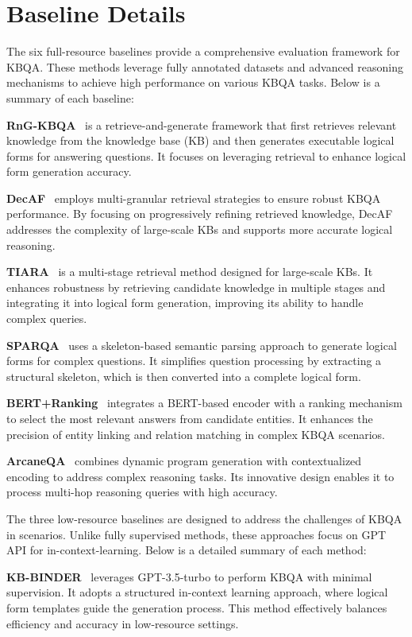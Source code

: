 \documentclass{article}
\theoremstyle{plain}
\theoremstyle{definition}
\theoremstyle{remark}
\begin{document}
\section{Baseline Details}
\label{baseline}
The six full-resource baselines provide a comprehensive evaluation framework for KBQA. These methods leverage fully annotated datasets and advanced reasoning mechanisms to achieve high performance on various KBQA tasks. Below is a summary of each baseline:

\textbf{RnG-KBQA}~\cite{RnG-KBQA} is a retrieve-and-generate framework that first retrieves relevant knowledge from the knowledge base (KB) and then generates executable logical forms for answering questions. It focuses on leveraging retrieval to enhance logical form generation accuracy.

\textbf{DecAF}~\cite{DecAF} employs multi-granular retrieval strategies to ensure robust KBQA performance. By focusing on progressively refining retrieved knowledge, DecAF addresses the complexity of large-scale KBs and supports more accurate logical reasoning.

\textbf{TIARA}~\cite{TIARA} is a multi-stage retrieval method designed for large-scale KBs. It enhances robustness by retrieving candidate knowledge in multiple stages and integrating it into logical form generation, improving its ability to handle complex queries.

\textbf{SPARQA}~\cite{SPARQA} uses a skeleton-based semantic parsing approach to generate logical forms for complex questions. It simplifies question processing by extracting a structural skeleton, which is then converted into a complete logical form.

\textbf{BERT+Ranking}~\cite{GrailQA} integrates a BERT-based encoder with a ranking mechanism to select the most relevant answers from candidate entities. It enhances the precision of entity linking and relation matching in complex KBQA scenarios.

\textbf{ArcaneQA}~\cite{ArcaneQA} combines dynamic program generation with contextualized encoding to address complex reasoning tasks. Its innovative design enables it to process multi-hop reasoning queries with high accuracy.

The three low-resource baselines are designed to address the challenges of KBQA in scenarios. Unlike fully supervised methods, these approaches focus on GPT API for in-context-learning. Below is a detailed summary of each method:

\textbf{KB-BINDER}~\cite{KB-BINDER} leverages GPT-3.5-turbo to perform KBQA with minimal supervision. It adopts a structured in-context learning approach, where logical form templates guide the generation process. This method effectively balances efficiency and accuracy in low-resource settings.
\end{document}
